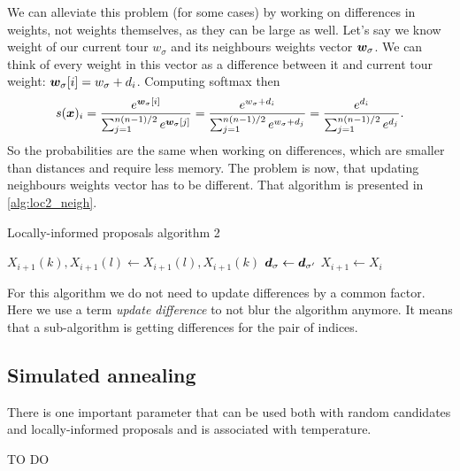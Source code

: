 		We can alleviate this problem (for some cases) by working on differences in weights, not weights themselves, as they can be large as well. Let's say we know weight of our current tour $w_\sigma$ and its neighbours weights vector $\bm{w}_\sigma$. We can think of every weight in this vector as a difference between it and current tour weight: $\bm{w}_{\sigma}[i] = w_\sigma + d_i$. Computing softmax then
		\begin{equation*}
			s(\bm{x})_i = \frac{e^{\bm{w}_{\sigma}[i]}}{\sum_{j=1}^{n(n-1)/2} e^{\bm{w}_{\sigma}[j]}} =\frac{e^{w_\sigma + d_i}}{\sum_{j=1}^{n(n-1)/2} e^{w_\sigma + d_j}} = \frac{e^{d_i}}{\sum_{j=1}^{n(n-1)/2} e^{d_j}}.
		\end{equation*}
		So the probabilities are the same when working on differences, which are smaller than distances and require less memory. The problem is now, that updating neighbours weights vector has to be different. That algorithm is presented in \ref{alg:loc2_neigh}.
		\begin{algorithm}
			\caption{Locally-informed proposals algorithm 2}\label{alg:loc2_neigh}
			\begin{algorithmic}[1]
				
					
					
								  
							\EndIf
						\EndFor
					\EndFor
					
						\State $X_{i+1}(k), X_{i+1}(l) \gets X_{i+1}(l), X_{i+1}(k)$
						\State $\bm{d}_{\sigma} \gets \bm{d}_{\sigma'}$
					\Else
						\State $X_{i+1} \gets X_i$
					\EndIf
				\EndFor
			\end{algorithmic}
		\end{algorithm}
		For this algorithm we do not need to update differences by a common factor. Here we use a term \textit{update difference} to not blur the algorithm anymore. It means that a sub-algorithm is getting differences for the pair of indices.
		
\subsection{Simulated annealing}
	There is one important parameter that can be used both with random candidates and locally-informed proposals and is associated with temperature.
	
	TO DO